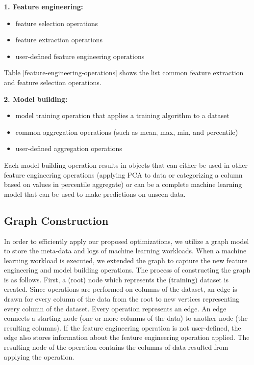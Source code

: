 \textbf{1. Feature engineering:}
\begin{itemize}
\item feature selection operations
\item feature extraction operations
\item user-defined feature engineering operations
\end{itemize}

Table \ref{feature-engineering-operations} shows the list common feature extraction and feature selection operations.

\textbf{2. Model building: }
\begin{itemize}
\item model training operation that applies a training algorithm to a dataset
\item common aggregation operations (such as mean, max, min, and percentile)
\item user-defined aggregation operations 
\end{itemize}
Each model building operation results in objects that can either be used in other feature engineering operations (applying PCA to data or categorizing a column based on values in percentile aggregate) or can be a complete machine learning model that can be used to make predictions on unseen data.

\subsection{Graph Construction}\label{sub-graph-construction}
In order to efficiently apply our proposed optimizations, we utilize a graph model to store the meta-data and logs of machine learning workloads.
When a machine learning workload is executed, we extended the graph to capture the new feature engineering and model building operations.
The process of constructing the graph is as follows.
First, a (root) node which represents the (training) dataset is created.
Since operations are performed on columns of the dataset, an edge is drawn for every column of the data from the root to new vertices representing every column of the dataset.
Every operation represents an edge.
An edge connects a starting node (one or more columns of the data) to another node (the resulting columns).
If the feature engineering operation is not user-defined, the edge also stores information about the feature engineering operation applied.
The resulting node of the operation contains the columns of data resulted from applying the operation.

